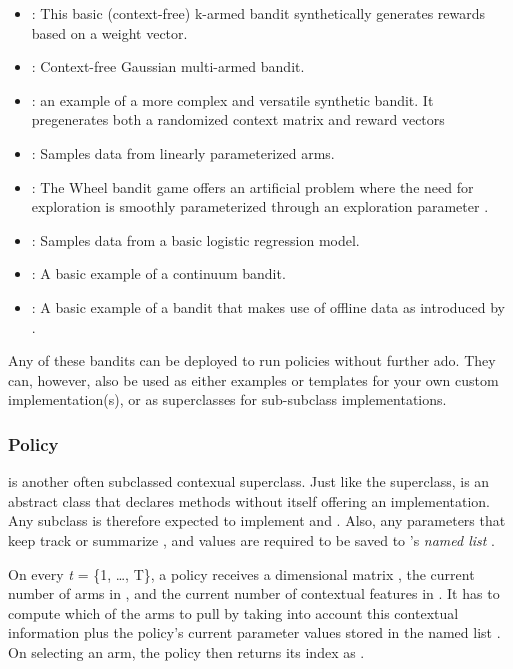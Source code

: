 \documentclass{jss}
\begin{document}
\begin{itemize}
         \item {}: This basic (context-free) k-armed bandit synthetically generates rewards based on a weight vector.
         \item {}: Context-free Gaussian multi-armed bandit.
         \item {}: an example of a more complex and versatile synthetic bandit. It pregenerates both a randomized context matrix and reward vectors
         \item {}: Samples data from linearly parameterized arms.
         \item {}: The Wheel bandit game offers an artificial problem where the need for exploration is smoothly parameterized through an exploration parameter \citep{Riquelme2018}.
         \item {}: Samples data from a basic logistic regression model.
         \item {}: A basic example of a continuum bandit.
         \item {}: A basic example of a bandit that makes use of offline data as introduced by \cite{Li2010}.
\end{itemize}



Any of these bandits can be deployed to run policies without further ado. They can, however, also be used as either examples or templates for your own custom  implementation(s), or as superclasses for sub-subclass implementations.

\subsubsection{Policy}

 is another often subclassed contexual superclass. Just like the  superclass,  is an abstract class that declares methods without itself offering an implementation. Any  subclass is therefore expected to implement  and . Also, any parameters that keep track or summarize ,  and  values are required to be saved to 's \textit{named list} .

On every \emph{t} = \{1, \ldots, T\}, a policy receives a  dimensional matrix , the current number of  arms in , and the current number of contextual features in . It has to compute which of the   arms to pull by taking into account this contextual information plus the policy's current parameter values stored in the named list . On selecting an arm, the policy then returns its index as .
\end{document}
